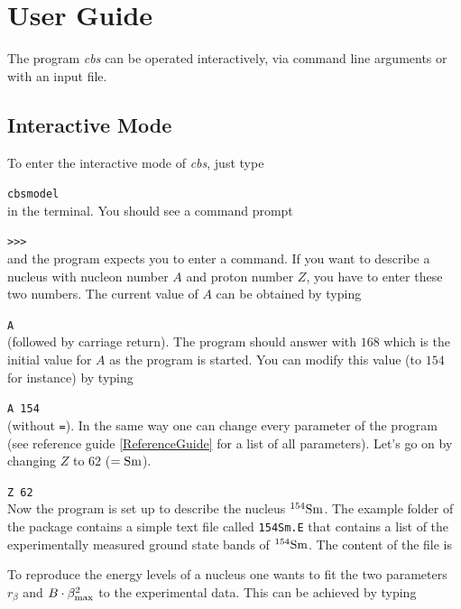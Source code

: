 \documentclass[10pt,a4paper]{article}
\begin{document}
\section{User Guide}
The program \textit{cbs} can be operated interactively, via command line arguments or with an input file.
\subsection{Interactive Mode}
To enter the interactive mode of \textit{cbs}, just type 

\verb!cbsmodel! \\
in the terminal. You should see a command prompt 

\verb!>>>! \\
and the program expects you to enter a command. If you want to describe a nucleus with nucleon number $A$ and proton number $Z$, you have to enter these two numbers. The current value of $A$ can be obtained by typing 

\verb!A! \\
(followed by carriage return). The program should answer with $168$ which is the initial value for $A$ as the program is started. You can modify this value (to $154$ for instance) by typing 

\verb!A 154! \\
(without \verb!=!). In the same way one can change every parameter of the program (see reference guide \ref{ReferenceGuide} for a list of all parameters). Let's go on by changing $Z$ to $62$ ($={\rm Sm}$). 

\verb!Z 62! \\
Now the program is set up to describe the nucleus $^{154}{\rm Sm}$. The example folder of the package contains a simple text file called \verb!154Sm.E! that contains a list of the experimentally measured ground state bands of $^{154}{\rm Sm}$. The content of the file is

 
To reproduce the energy levels of a nucleus one wants to fit the two parameters $r_{\beta}$ and $B\cdot\beta_{\rm max}^2$ to the experimental data. This can be achieved by typing
\end{document}
